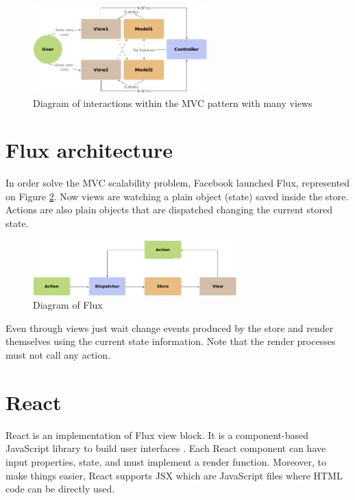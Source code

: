 \begin{figure}[htb]
	\begin{center}
		\includegraphics[width=0.6\textwidth]{./figures/mvc-complex.png}
		\caption{Diagram of interactions within the MVC pattern with many views}
		\label{F:mvc-complex}
	\end{center}
\end{figure}

\section{Flux architecture}

In order solve the MVC scalability problem, Facebook launched Flux, represented
on Figure \ref{F:flux}. Now views are watching a plain object (state) saved
inside the store. Actions are also plain objects that are dispatched changing
the current stored state.

\begin{figure}[htb]
	\begin{center}
		\includegraphics[width=0.7\textwidth]{./figures/flux.png}
		\caption{Diagram of Flux}
		\label{F:flux}
	\end{center}
\end{figure}

Even through views just wait change events produced by the store and render
themselves using the current state information. Note that the render processes
must not call any action.

\section{React}

React is an implementation of Flux view block. It is a component-based 
JavaScript library to build user interfaces \cite{react-web}. Each React
component can have input properties, state, and must implement a render
function. Moreover, to make things easier, React supports JSX which are
JavaScript files where HTML code can be directly used.

